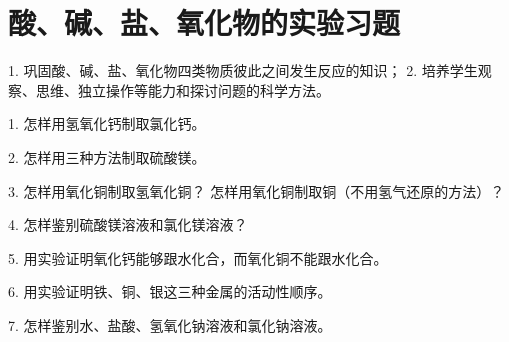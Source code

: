 \section{酸、碱、盐、氧化物的实验习题}\label{sec:xssy-sy10}

\begin{shiyanmudi}
    1. 巩固酸、碱、盐、氧化物四类物质彼此之间发生反应的知识； 2. 培养学生观察、思维、独立操作等能力和探讨问题的科学方法。
\end{shiyanmudi}


\begin{shiyanxiti}
    1. 怎样用氢氧化钙制取氯化钙。

    2. 怎样用三种方法制取硫酸镁。

    3. 怎样用氧化铜制取氢氧化铜？ 怎样用氧化铜制取铜（不用氢气还原的方法）？

    4. 怎样鉴别硫酸镁溶液和氯化镁溶液？

    5. 用实验证明氧化钙能够跟水化合，而氧化铜不能跟水化合。

    6. 用实验证明铁、铜、银这三种金属的活动性顺序。

    7. 怎样鉴别水、盐酸、氢氧化钠溶液和氯化钠溶液。
\end{shiyanxiti}

